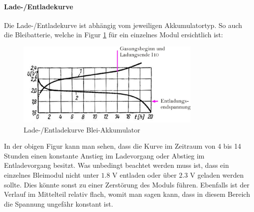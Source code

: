 \newpage

\paragraph{Lade-/Entladekurve}
Die Lade-/Entladekurve ist abhängig vom jeweiligen Akkumulatortyp. So auch die Bleibatterie, welche in Figur \ref{fig:pb_akku_kurve} für ein einzelnes Modul ersichtlich ist:

\begin{figure}[h!]
	\centering
		\includegraphics[width=0.8\textwidth]{images/pb_akku_kurve.jpg}
	\caption{Lade-/Entladekurve Blei-Akkumulator \cite{pb_akku_kurve}}
	\label{fig:pb_akku_kurve}
\end{figure}

In der obigen Figur kann man sehen, dass die Kurve im Zeitraum von 4 bis 14 Stunden einen konstante Anstieg im Ladevorgang oder Abstieg im Entladevorgang besitzt. Was unbedingt beachtet werden muss ist, dass ein einzelnes Bleimodul nicht unter $1.8$ V entladen oder über $2.3$ V geladen werden sollte. Dies könnte sonst zu einer Zerstörung des Moduls führen. Ebenfalls ist der Verlauf im Mittelteil relativ flach, womit man sagen kann, dass in diesem Bereich die Spannung ungefähr konstant ist.

\newpage